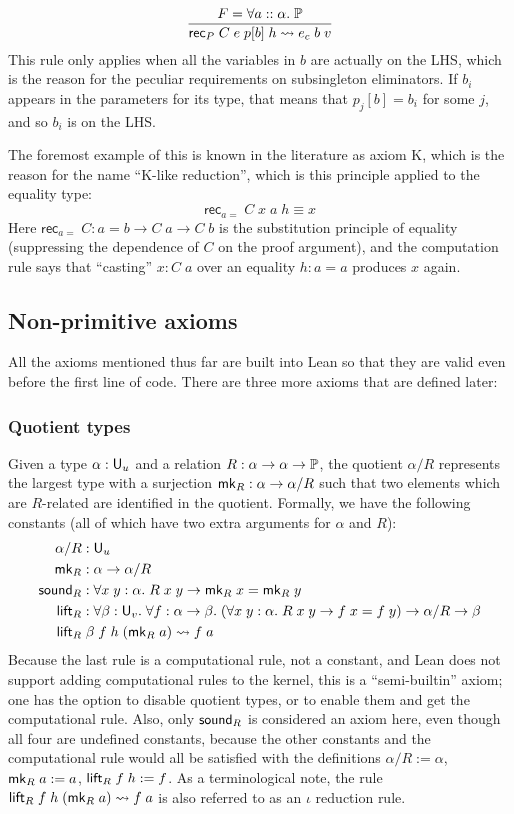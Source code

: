 $$\frac{F=\forall a::\alpha.\;\P}{\rec_P\;C\;e\;p[b]\;h\rightsquigarrow e_c\;b\;v}$$
This rule only applies when all the variables in $b$ are actually on the LHS, which is the reason for the peculiar requirements on subsingleton eliminators. If $b_i$ appears in the parameters for its type, that means that $p_j[b]=b_i$ for some $j$, and so $b_i$ is on the LHS.

The foremost example of this is known in the literature as axiom K, which is the reason for the name ``K-like reduction'', which is this principle applied to the equality type:
$$\mathsf{rec}_{a=}\;C\;x\;a\;h\equiv x$$
Here $\mathsf{rec}_{a=}\;C:a=b\to C\;a\to C\;b$ is the substitution principle of equality (suppressing the dependence of $C$ on the proof argument), and the computation rule says that ``casting'' $x:C\;a$ over an equality $h:a=a$ produces $x$ again.
%
\subsection{Non-primitive axioms}

All the axioms mentioned thus far are built into Lean so that they are valid even before the first line of code. There are three more axioms that are defined later:

\subsubsection{Quotient types}
Given a type $\alpha:\U_u$ and a relation $R:\alpha\to\alpha\to\P$, the quotient $\alpha/R$ represents the largest type with a surjection $\mk_R:\alpha\to\alpha/R$ such that two elements which are $R$-related are identified in the quotient. Formally, we have the following constants (all of which have two extra arguments for $\alpha$ and $R$):
\begin{align*}
\alpha/R&:\U_u\\
\mk_R&:\alpha\to\alpha/R\\
\sound_R&:\forall x\;y:\alpha.\;R\;x\;y\to \mk_R\;x=\mk_R\;y\\
\lift_R&:\forall\beta:\U_v.\;\forall f:\alpha\to\beta.\;(\forall x\;y:\alpha.\;R\;x\;y\to f\;x=f\;y)\to \alpha/R\to\beta\\
\lift_R&\;\beta\;f\;h\;(\mk_R\;a)\rightsquigarrow f\;a
\end{align*}
Because the last rule is a computational rule, not a constant, and Lean does not support adding computational rules to the kernel, this is a ``semi-builtin'' axiom; one has the option to disable quotient types, or to enable them and get the computational rule. Also, only $\sound_R$ is considered an axiom here, even though all four are undefined constants, because the other constants and the computational rule would all be satisfied with the definitions $\alpha/R:=\alpha$, $\mk_R\;a:=a$, $\lift_R\;f\;h:=f$. As a terminological note, the rule $\lift_R\;f\;h\;(\mk_R\;a)\rightsquigarrow f\;a$ is also referred to as an $\iota$ reduction rule.

